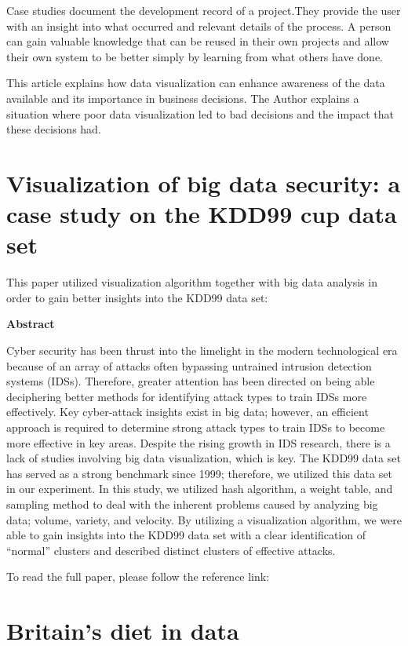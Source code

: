 \documentclass[]{book}
\theoremstyle{definition}
\theoremstyle{definition}
\theoremstyle{definition}
\theoremstyle{remark}
\begin{document}
Case studies document the development record of a project.They provide
the user with an insight into what occurred and relevant details of the
process. A person can gain valuable knowledge that can be reused in
their own projects and allow their own system to be better simply by
learning from what others have done.

This article explains how data visualization can enhance awareness of
the data available and its importance in business decisions. The Author
explains a situation where poor data visualization led to bad decisions
and the impact that these decisions had.

\section{Visualization of big data security: a case study on the KDD99
cup data
set}\label{visualization-of-big-data-security-a-case-study-on-the-kdd99-cup-data-set}

This paper utilized visualization algorithm together with big data
analysis in order to gain better insights into the KDD99 data set:

\textbf{Abstract}

Cyber security has been thrust into the limelight in the modern
technological era because of an array of attacks often bypassing
untrained intrusion detection systems (IDSs). Therefore, greater
attention has been directed on being able deciphering better methods for
identifying attack types to train IDSs more effectively. Key
cyber-attack insights exist in big data; however, an efficient approach
is required to determine strong attack types to train IDSs to become
more effective in key areas. Despite the rising growth in IDS research,
there is a lack of studies involving big data visualization, which is
key. The KDD99 data set has served as a strong benchmark since 1999;
therefore, we utilized this data set in our experiment. In this study,
we utilized hash algorithm, a weight table, and sampling method to deal
with the inherent problems caused by analyzing big data; volume,
variety, and velocity. By utilizing a visualization algorithm, we were
able to gain insights into the KDD99 data set with a clear
identification of ``normal'' clusters and described distinct clusters of
effective attacks.

To read the full paper, please follow the reference link: \citep{KDD99}

\section{Britain's diet in data}\label{britains-diet-in-data}
\end{document}
